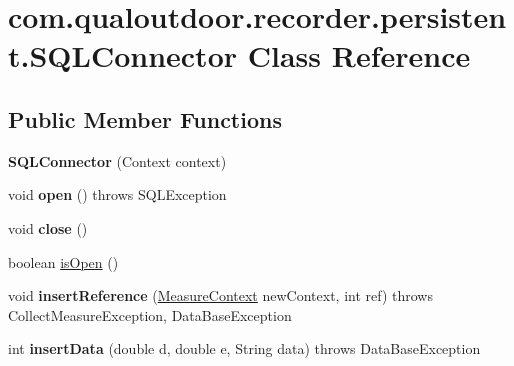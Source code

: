 \hypertarget{classcom_1_1qualoutdoor_1_1recorder_1_1persistent_1_1SQLConnector}{\section{com.\-qualoutdoor.\-recorder.\-persistent.\-S\-Q\-L\-Connector Class Reference}
\label{classcom_1_1qualoutdoor_1_1recorder_1_1persistent_1_1SQLConnector}
}
\subsection*{Public Member Functions}
\begin{DoxyCompactItemize}
\item 
\hypertarget{classcom_1_1qualoutdoor_1_1recorder_1_1persistent_1_1SQLConnector_a728bdb7be51e691a3de92ac80f819e4b}{{\bfseries S\-Q\-L\-Connector} (Context context)}\label{classcom_1_1qualoutdoor_1_1recorder_1_1persistent_1_1SQLConnector_a728bdb7be51e691a3de92ac80f819e4b}

\item 
\hypertarget{classcom_1_1qualoutdoor_1_1recorder_1_1persistent_1_1SQLConnector_a6268906b87698e52bce821ad4f8b9069}{void {\bfseries open} ()  throws S\-Q\-L\-Exception }\label{classcom_1_1qualoutdoor_1_1recorder_1_1persistent_1_1SQLConnector_a6268906b87698e52bce821ad4f8b9069}

\item 
\hypertarget{classcom_1_1qualoutdoor_1_1recorder_1_1persistent_1_1SQLConnector_a1def5a9d3f9b9a5f34341be0d8f39bf1}{void {\bfseries close} ()}\label{classcom_1_1qualoutdoor_1_1recorder_1_1persistent_1_1SQLConnector_a1def5a9d3f9b9a5f34341be0d8f39bf1}

\item 
boolean \hyperlink{classcom_1_1qualoutdoor_1_1recorder_1_1persistent_1_1SQLConnector_ad06cc505fd02bc2639090f59c7ba03c2}{is\-Open} ()
\item 
\hypertarget{classcom_1_1qualoutdoor_1_1recorder_1_1persistent_1_1SQLConnector_a64c7dc4a0535660bc13d2d0987fbdd28}{void {\bfseries insert\-Reference} (\hyperlink{classcom_1_1qualoutdoor_1_1recorder_1_1persistent_1_1MeasureContext}{Measure\-Context} new\-Context, int ref)  throws Collect\-Measure\-Exception, Data\-Base\-Exception }\label{classcom_1_1qualoutdoor_1_1recorder_1_1persistent_1_1SQLConnector_a64c7dc4a0535660bc13d2d0987fbdd28}

\item 
\hypertarget{classcom_1_1qualoutdoor_1_1recorder_1_1persistent_1_1SQLConnector_ac06733a51579efba085681f3e9cdcac4}{int {\bfseries insert\-Data} (double d, double e, String data)  throws Data\-Base\-Exception }\label{classcom_1_1qualoutdoor_1_1recorder_1_1persistent_1_1SQLConnector_ac06733a51579efba085681f3e9cdcac4}


\end{DoxyCompactItemize}
